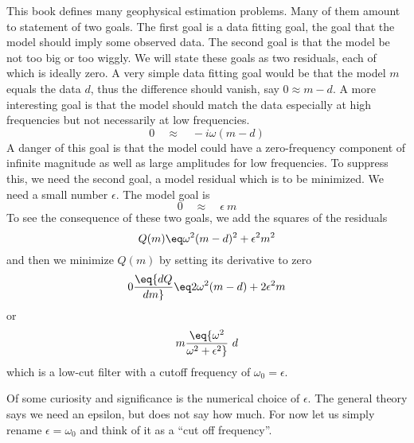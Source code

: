 This book defines many geophysical estimation problems.
Many of them amount to statement of two goals.
The first goal is a data fitting goal,
the goal that the model should imply some observed data.
The second goal is that the model be not too big or too wiggly.
We will state these goals as two residuals, each of which is ideally zero.
A very simple data fitting goal would be that
the model $m$ equals the data $d$,
thus the difference should vanish, say $0\approx  m- d$.
A more interesting goal is that the model should match the data
especially at high frequencies but not necessarily at low frequencies.
\begin{equation}
0 \quad\approx\quad  -i\omega(m - d)
\end{equation}
A danger of this goal is that the model could have a zero-frequency component
of infinite magnitude as well as large amplitudes for low frequencies.
To suppress this, we need the second goal, a model residual
which is to be minimized.  We need a small number $\epsilon$.
The model goal is
\begin{equation}
0 \quad\approx\quad \epsilon \ m
\end{equation}
To see the consequence of these two goals,
we add the squares of the residuals
\begin{equation}
 Q(m) \eq \omega^2 (m-d)^2 + \epsilon^2  m^2
\end{equation}
and then we minimize $Q(m)$ by setting its derivative to zero
\begin{equation}
0\eq {dQ\over dm} \eq 2 \omega^2 (m-d) + 2\epsilon^2  m
\end{equation}
or
\begin{equation}
m \eq  {\omega^2 \over \omega^2+ \epsilon^2}\  d
\label{eqn:lowcut}
\end{equation}
which is a low-cut filter
with a cutoff frequency of $\omega_0=\epsilon$.

\par
Of some curiosity and significance is the numerical choice of $\epsilon$.
The general theory says we need an epsilon,
but does not say how much.
For now let us simply rename $\epsilon=\omega_0$
and think of it as a ``cut off frequency''.


